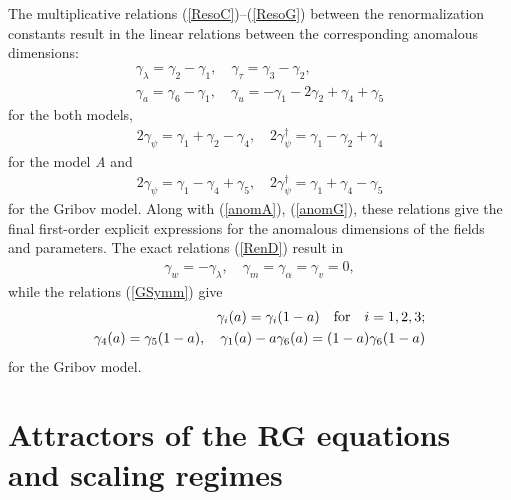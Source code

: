 \documentclass[12pt]{article}
\begin{document}
The multiplicative relations (\ref{ResoC})--(\ref{ResoG})
between the renormalization constants result in the linear relations
between the corresponding anomalous dimensions:
\begin{eqnarray}
\gamma_{\lambda} =  \gamma_{2} -\gamma_{1}, \quad
\gamma_{\tau} =  \gamma_{3} -\gamma_{2} , \nonumber \\
\gamma_{a} =  \gamma_{6} -\gamma_{1}, \quad
\gamma_{u} = -\gamma_{1}- 2\gamma_{2} +\gamma_{4} + \gamma_{5}
\label{aesoC}
\end{eqnarray}
for the both models,
\begin{eqnarray}
2\gamma_{\psi}= \gamma_{1} +\gamma_{2} -\gamma_{4}, \quad
2\gamma_{\psi}^{\dag}= \gamma_{1} - \gamma_{2} + \gamma_{4}
\label{aesoA}
\end{eqnarray}
for the model {\it A} and
\begin{eqnarray}
2\gamma_{\psi}= \gamma_{1}- \gamma_{4} + \gamma_{5}, \quad
2\gamma_{\psi}^{\dag}= \gamma_{1}+ \gamma_{4} -  \gamma_{5}
\label{aesoG}
\end{eqnarray}
for the Gribov model. Along with (\ref{anomA}), (\ref{anomG}), these
relations give the final
first-order explicit expressions for the anomalous dimensions of the
fields and parameters. The exact relations (\ref{RenD}) result in
\begin{eqnarray}
\gamma_{w} =-\gamma_{\lambda}, \quad
\gamma_{m} =\gamma_{\alpha} =\gamma_{v} = 0,
\label{exi}
\end{eqnarray}
while the relations (\ref{GSymm}) give
\begin{eqnarray}
\gamma_{i} (a) = \gamma_{i} (1-a) \quad {\rm for} \quad i=1,2,3;
\nonumber \\
\gamma_{4} (a) = \gamma_{5} (1-a), \quad
\gamma_{1} (a) -a \gamma_{6}(a) = (1-a) \gamma_{6}(1-a)
\label{SymmG}
\end{eqnarray}
for the Gribov model.



\section{Attractors of the RG equations and scaling regimes} \label{sec:FPS}
\end{document}
